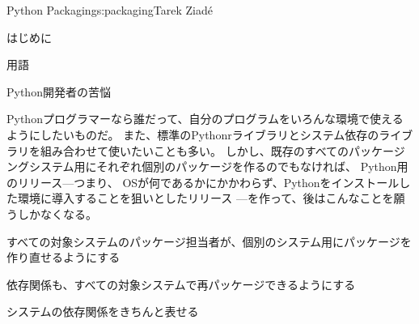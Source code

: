 \begin{aosachapter}{Python Packaging}{s:packaging}{Tarek Ziad\'{e}}
\begin{aosasect1}{はじめに}
\begin{aosabox}{用語}
\end{aosabox}

\end{aosasect1}

\begin{aosasect1}{Python開発者の苦悩}

Pythonプログラマーなら誰だって、自分のプログラムをいろんな環境で使えるようにしたいものだ。
また、標準のPythonrライブラリとシステム依存のライブラリを組み合わせて使いたいことも多い。
しかし、既存のすべてのパッケージングシステム用にそれぞれ個別のパッケージを作るのでもなければ、
Python用のリリース---つまり、
OSが何であるかにかかわらず、Pythonをインストールした環境に導入することを狙いとしたリリース
---を作って、後はこんなことを願うしかなくなる。

\begin{aosaitemize}

  \item すべての対象システムのパッケージ担当者が、個別のシステム用にパッケージを作り直せるようにする

  \item 依存関係も、すべての対象システムで再パッケージできるようにする

  \item システムの依存関係をきちんと表せる

\end{aosaitemize}


\end{aosasect1}
\end{aosachapter}
